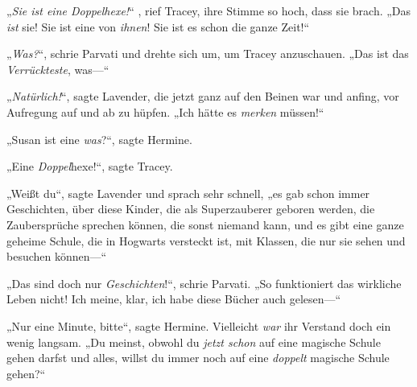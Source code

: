 „\emph{Sie ist eine Doppelhexe!}“ , rief Tracey, ihre Stimme so hoch, dass sie brach. „Das \emph{ist} sie! Sie ist eine von \emph{ihnen}! Sie ist es schon die ganze Zeit!“

„\emph{Was?}“, schrie Parvati und drehte sich um, um Tracey anzuschauen. „Das ist das \emph{Verrückteste}, was—“

„\emph{Natürlich!}“, sagte Lavender, die jetzt ganz auf den Beinen war und anfing, vor Aufregung auf und ab zu hüpfen. „Ich hätte es \emph{merken} müssen!“

„Susan ist eine \emph{was}?“, sagte Hermine.

„Eine \emph{Doppel}{}hexe!“, sagte Tracey.

„Weißt du“, sagte Lavender und sprach sehr schnell, „es gab schon immer Geschichten, über diese Kinder, die als Superzauberer geboren werden, die Zaubersprüche sprechen können, die sonst niemand kann, und es gibt eine ganze geheime Schule, die in Hogwarts versteckt ist, mit Klassen, die nur sie sehen und besuchen können—“

„Das sind doch nur \emph{Geschichten}!“, schrie Parvati. „So funktioniert das wirkliche Leben nicht! Ich meine, klar, ich habe diese Bücher auch gelesen—“

„Nur eine Minute, bitte“, sagte Hermine. Vielleicht \emph{war} ihr Verstand doch ein wenig langsam. „Du meinst, obwohl du \emph{jetzt schon} auf eine magische Schule gehen darfst und alles, willst du immer noch auf eine \emph{doppelt} magische Schule gehen?“

